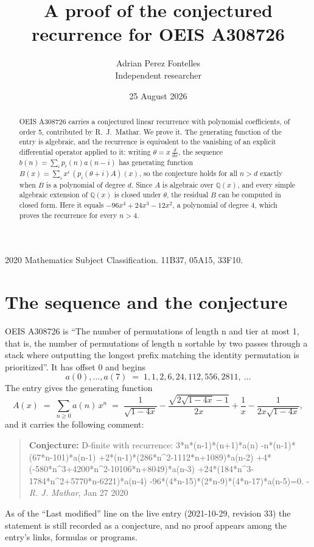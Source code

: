 \documentclass[11pt,a4paper]{article}
\title{A proof of the conjectured recurrence for OEIS A308726}
\author{Adrian Perez Fontelles\\ \small Independent researcher}
\date{25 August 2026}
\theoremstyle{plain}
\theoremstyle{definition}
\begin{document}
\maketitle

\begin{abstract}
OEIS A308726 carries a conjectured linear recurrence with polynomial coefficients, of
order 5, contributed by R.~J.~Mathar. We prove it. The generating function of the
entry is algebraic, and the recurrence is equivalent to the vanishing of an explicit
differential operator applied to it: writing $\theta=x\,\frac{d}{dx}$, the sequence
$b(n)=\sum_{i}p_{i}(n)a(n-i)$ has generating function
$B(x)=\sum_{i}x^{i}\,(p_{i}(\theta+i)A)(x)$, so the conjecture holds for all $n>d$ exactly
when $B$ is a polynomial of degree $d$. Since $A$ is algebraic over $\mathbb{Q}(x)$, and every simple
algebraic extension of $\mathbb{Q}(x)$ is closed under $\theta$, the residual $B$ can be
computed in closed form. Here it equals $- 96 x^{4} + 24 x^{3} - 12 x^{2}$, a polynomial of degree $4$, which proves
the recurrence for every $n>4$.
\end{abstract}

\noindent\small 2020 Mathematics Subject Classification. 11B37, 05A15, 33F10.\normalsize

\section{The sequence and the conjecture}

OEIS A308726 is ``The number of permutations of length n and tier at most 1, that is, the number of permutations of length n sortable by two passes through a stack where outputting the longest prefix matching the identity permutation is prioritized''. It has offset $0$ and begins
\[
a(0),\dots,a(7)\;=\;1, 1, 2, 6, 24, 112, 556, 2811,\ \dots
\]
The entry gives the generating function
\begin{equation}\label{eq:gf}
A(x)\;=\;\sum_{n\ge 0} a(n)\,x^{n}\;=\;\frac{1}{\sqrt{1 - 4 x}} - \frac{\sqrt{2 \sqrt{1 - 4 x} - 1}}{2 x} + \frac{1}{x} - \frac{1}{2 x \sqrt{1 - 4 x}} ,
\end{equation}
and it carries the following comment:
\begin{quote}\small
\textbf{Conjecture:} D-finite with recurrence: 3*n*(n-1)*(n+1)*a(n) -n*(n-1)*(67*n-101)*a(n-1) +2*(n-1)*(286*n\^{}2-1112*n+1089)*a(n-2) +4*(-580*n\^{}3+4200*n\^{}2-10106*n+8049)*a(n-3) +24*(184*n\^{}3-1784*n\^{}2+5770*n-6221)*a(n-4) -96*(4*n-15)*(2*n-9)*(4*n-17)*a(n-5)=0. - \emph{R. J. Mathar}, Jan 27 2020
\end{quote}
As of the ``Last modified'' line on the live entry (2021-10-29, revision 33) the
statement is still recorded as a conjecture, and no proof appears among the entry's links,
formulas or programs.
\end{document}

